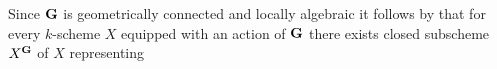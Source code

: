 \begin{remark}\label{remark:existence_of_fixed_points_for_geom_conn_locally_alg_group}
Since $\mathbf{G}$ is geometrically connected and locally algebraic it follows by {\cite[Theorem 7.2]{Group_schemes_over_field}} that for every $k$-scheme $X$ equipped with an action of $\mathbf{G}$ there exists closed subscheme $X^{\mathbf{G}}$ of $X$ representing
\end{remark}


































































\small




